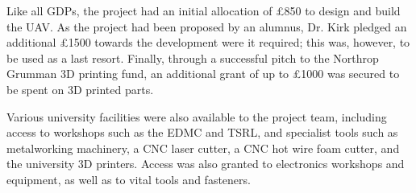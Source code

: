 \documentclass[../../main.tex]{subfiles}
\begin{document}
Like all GDPs, the project had an initial allocation of £850 to design and build the UAV.
As the project had been proposed by an alumnus, Dr. Kirk pledged an additional £1500 towards the development were it required; this was, however, to be used as a last resort.
Finally, through a successful pitch to the Northrop Grumman 3D printing fund, an additional grant of up to £1000 was secured to be spent on 3D printed parts. 

Various university facilities were also available to the project team, including access to workshops such as the EDMC and TSRL, and specialist tools such as metalworking machinery, a CNC laser cutter, a CNC hot wire foam cutter, and the university 3D printers.
Access was also granted to electronics workshops and equipment, as well as to vital tools and fasteners.
\end{document}
